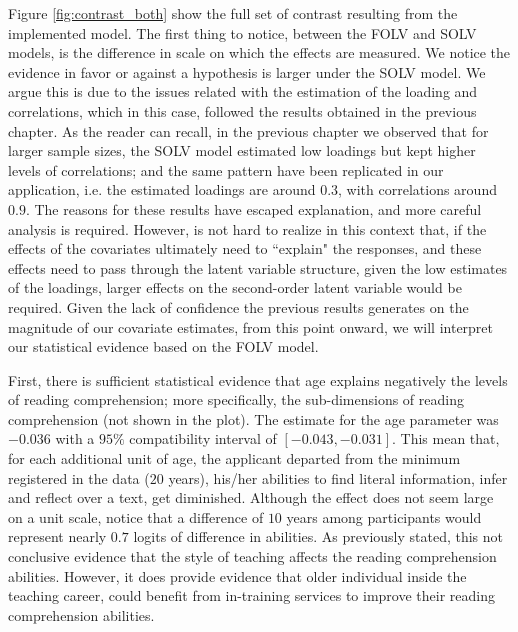 Figure \ref{fig:contrast_both} show the full set of contrast resulting from the implemented model. The first thing to notice, between the FOLV and SOLV models, is the difference in scale on which the effects are measured. We notice the evidence in favor or against a hypothesis is larger under the SOLV model. We argue this is due to the issues related with the estimation of the loading and correlations, which in this case, followed the results obtained in the previous chapter. As the reader can recall, in the previous chapter we observed that for larger sample sizes, the SOLV model estimated low loadings but kept higher levels of correlations; and the same pattern have been replicated in our application, i.e. the estimated loadings are around $0.3$, with correlations around $0.9$. The reasons for these results have escaped explanation, and more careful analysis is required. However, is not hard to realize in this context that, if the effects of the covariates ultimately need to ``explain" the responses, and these effects need to pass through the latent variable structure, given the low estimates of the loadings, larger effects on the second-order latent variable would be required. Given the lack of confidence the previous results generates on the magnitude of our covariate estimates, from this point onward, we will interpret our statistical evidence based on the FOLV model.

First, there is sufficient statistical evidence that age explains negatively the levels of reading comprehension; more specifically, the sub-dimensions of reading comprehension (not shown in the plot). The estimate for the age parameter was $-0.036$ with a $95\%$ compatibility interval of $[-0.043, -0.031]$. This mean that, for each additional unit of age, the applicant departed from the minimum registered in the data ($20$ years), his/her abilities to find literal information, infer and reflect over a text, get diminished. Although the effect does not seem large on a unit scale, notice that a difference of $10$ years among participants would represent nearly $0.7$ logits of difference in abilities. As previously stated, this not conclusive evidence that the style of teaching affects the reading comprehension abilities. However, it does provide evidence that older individual inside the teaching career, could benefit from in-training services to improve their reading comprehension abilities.

